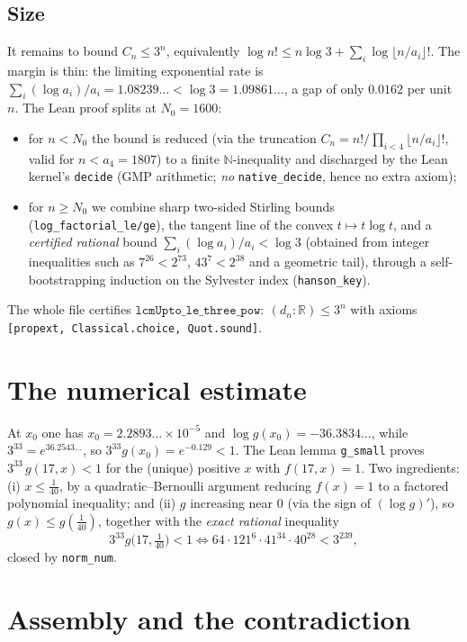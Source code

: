 \documentclass[11pt]{article}
\theoremstyle{definition}
\newcommand{\R}{\mathbb{R}}
\newcommand{\N}{\mathbb{N}}
\newcommand{\code}[1]{\texttt{#1}}
\begin{document}
\subsection{Size}

It remains to bound $C_n\le3^n$, equivalently
$\log n!\le n\log3+\sum_i\log\lfloor n/a_i\rfloor!$. The margin is thin: the
limiting exponential rate is
$\sum_i (\log a_i)/a_i=1.08239\ldots<\log3=1.09861\ldots$, a gap of only
$0.0162$ per unit $n$. The Lean proof splits at $N_0=1600$:
\begin{itemize}[nosep]
\item for $n<N_0$ the bound is reduced (via the truncation
  $C_n=n!/\prod_{i<4}\lfloor n/a_i\rfloor!$, valid for $n<a_4=1807$) to a
  finite $\N$-inequality and discharged by the Lean kernel's \code{decide}
  (GMP arithmetic; \emph{no} \code{native\_decide}, hence no extra axiom);
\item for $n\ge N_0$ we combine sharp two-sided Stirling bounds
  (\code{log\_factorial\_le/ge}), the tangent line of the convex $t\mapsto
  t\log t$, and a \emph{certified rational} bound
  $\sum_i(\log a_i)/a_i<\log3$ (obtained from integer inequalities such as
  $7^{26}<2^{73}$, $43^{7}<2^{38}$ and a geometric tail), through a
  self-bootstrapping induction on the Sylvester index (\code{hanson\_key}).
\end{itemize}
The whole file certifies
$\code{lcmUpto\_le\_three\_pow}:\ (d_n:\R)\le3^n$ with axioms
\code{[propext, Classical.choice, Quot.sound]}.

\section{The numerical estimate}\label{sec:numeric}

At $x_0$ one has $x_0=2.2893\ldots\times10^{-5}$ and $\log g(x_0)=-36.3834\ldots$,
while $3^{33}=e^{36.2543\ldots}$, so $3^{33}g(x_0)=e^{-0.129}<1$. The Lean
lemma \code{g\_small} proves $3^{33}\,g(17,x)<1$ for the (unique) positive $x$
with $f(17,x)=1$. Two ingredients: (i) $x\le\tfrac1{40}$, by a
quadratic--Bernoulli argument reducing $f(x)=1$ to a factored polynomial
inequality; and (ii) $g$ increasing near $0$ (via the sign of $(\log g)'$), so
$g(x)\le g(\tfrac1{40})$, together with the \emph{exact rational} inequality
\[
  3^{33}g\bigl(17,\tfrac1{40}\bigr)<1
  \iff 64\cdot121^{6}\cdot41^{34}\cdot40^{28}<3^{239},
\]
closed by \code{norm\_num}.

\section{Assembly and the contradiction}\label{sec:main}
\end{document}
